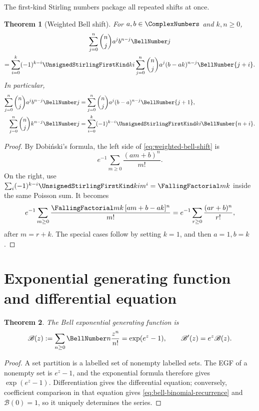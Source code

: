 \documentclass[11pt,a4paper,oneside,openany]{book}
\newtheorem{theorem}{Theorem}[chapter]
\theoremstyle{definition}
\theoremstyle{remark}
\begin{document}
The first-kind Stirling numbers package all repeated shifts at once.
\begin{theorem}[Weighted Bell shift]\label{thm:weighted-bell-shift}
For $a,b\in\ComplexNumbers$ and $k,n\ge0$,
\begin{multline}\label{eq:weighted-bell-shift}
 \sum_{j=0}^{n}\binom nj a^j b^{n-j}\BellNumber j\\
 =\sum_{i=0}^{k}(-1)^{k-i}\UnsignedStirlingFirstKind ki
   \sum_{j=0}^{n}\binom nj a^j(b-ak)^{n-j}\BellNumber{j+i}.
\end{multline}
In particular,
\begin{align}
 \sum_{j=0}^{n}\binom nj a^j b^{n-j}\BellNumber j
 &=\sum_{j=0}^{n}\binom nj a^j(b-a)^{n-j}\BellNumber{j+1},
 \label{eq:weighted-bell-k1}\\
 \sum_{j=0}^{n}\binom nj k^{n-j}\BellNumber j
 &=\sum_{i=0}^{k}(-1)^{k-i}\UnsignedStirlingFirstKind ki\BellNumber{n+i}.
 \label{eq:weighted-bell-special}
\end{align}
\end{theorem}
\begin{proof}
By Dobiński's formula, the left side of
\eqref{eq:weighted-bell-shift} is
\[
 e^{-1}\sum_{m\ge0}\frac{(am+b)^n}{m!}.
\]
On the right, use
$\sum_i(-1)^{k-i}\UnsignedStirlingFirstKind ki m^i=\FallingFactorial mk$ inside the same Poisson sum.  It
becomes
\[
 e^{-1}\sum_{m\ge0}\frac{\FallingFactorial mk\,[a m+b-ak]^n}{m!}
 =e^{-1}\sum_{r\ge0}\frac{(ar+b)^n}{r!},
\]
after $m=r+k$.  The special cases follow by setting $k=1$, and then $a=1,b=k$.
\end{proof}

\section{Exponential generating function and differential equation}
\begin{theorem}\label{thm:bell-egf}
The Bell exponential generating function is
\begin{equation}\label{eq:bell-egf}
 \mathscr B(z):=\sum_{n\ge0}\BellNumber n\frac{z^n}{n!}
 =\exp(e^z-1),
 \qquad
 \mathscr B'(z)=e^z\mathscr B(z).
\end{equation}
\end{theorem}
\begin{proof}
A set partition is a labelled set of nonempty labelled sets.  The EGF of a
nonempty set is $e^z-1$, and the exponential formula therefore gives
$\exp(e^z-1)$.  Differentiation gives the differential equation; conversely,
coefficient comparison in that equation gives
\eqref{eq:bell-binomial-recurrence} and $\mathscr B(0)=1$, so it uniquely determines
the series.
\end{proof}
\end{document}
